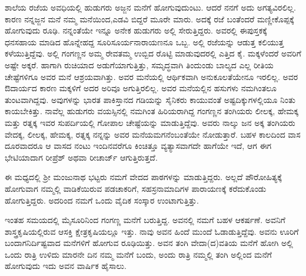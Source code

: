 {ಶಾಲೆಯ ರಜೆಯ ಅವಧಿಯಲ್ಲಿ ಹುಡುಗರು ಅಜ್ಜನ ಮನೆಗೆ ಹೋಗುವುದುಂಟು. ಆದರೆ ನನಗೆ ಅದು ಅಗತ್ಯವಿರಲಿಲ್ಲ. ಕಾರಣ ನನ್ನಜ್ಜನ ಮನೆ ನಮ್ಮ ಮನೆಯಿಂದ,\break ಎಡವಿ ಬಿದ್ದರೆ ಮೂರೇ ಮಾರು. ಅದಕ್ಕೆ ರಜೆ ಬಂತೆಂದರೆ ಮಣ್ಣೀಕೊಪ್ಪಕ್ಕೆ ಹೋಗುವುದು ರೂಢಿ. ನನ್ನಂತೆಯೇ ಇನ್ನೂ ಅನೇಕ ಹುಡುಗರು ಅಲ್ಲಿ ಸೇರುತ್ತಿದ್ದರು. ಅವರಲ್ಲಿ ಈ\break ಪುಸ್ತಕಕ್ಕೆ ಧನಸಹಾಯ ಮಾಡಿದ ಹೊನ್ನೇಹದ್ದ ಸೂರಿ\enginline{-}ಸೂರ್ಯನಾರಾಯಣನೂ ಒಬ್ಬ. ಅಲ್ಲಿ ರಜೆಯನ್ನು ಆಡುತ್ತ ಕಲಿಯುತ್ತ ಕಳೆಯುತ್ತಿದ್ದೆವು. ಅಲ್ಲಿ ಗಂಗಣ್ಣನ ಅಮ್ಮ \enginline{-} \hbox{ರೇವತಮ್ಮ} ಉಬ್ಬಿದ ರೊಟ್ಟಿ ಮಾಡುವುದರಲ್ಲಿ ಎತ್ತಿದ ಕೈ. ಮಕ್ಕಳೆಂದರೆ ಅವರಿಗೆ ಅಷ್ಟೇ ಅಕ್ಕರೆ. ಹಾಗಾಗಿ ರುಚಿಯಾದ ಅಡುಗೆಯಾಗುತ್ತಿತ್ತು, ಸಮೃದ್ಧವಾಗಿ ತಿಂದುಂಡು ಬಾಲ್ಯದ ಎಲ್ಲ ರೀತಿಯ ಚೇಷ್ಟೆಗಳಿಗೂ ಅವರ ಮನೆ ಆಶ್ರಯವಾಗಿತ್ತು. ಅವರ ಮನೆಯಲ್ಲಿ ಆರ್ಥಿಕವಾಗಿ ಅನುಕೂಲತೆಯೇನೂ ಇರಲಿಲ್ಲ. ಅವರ ಔದಾರ್ಯದ ಕಾರಣ ಮಕ್ಕಳಿಗೆ ಅದರ ಅರಿವೂ ಅಗುತ್ತಿರಲಿಲ್ಲ. ಅವರ ಮನೆಯಲ್ಲಿನ ಹಸುಗಳು ನಮಗಿಂತಲೂ ತುಂಟವಾಗಿದ್ದವು. ಅವುಗಳನ್ನು ಭಾರತ ಪಾಕಿಸ್ತಾನದ ಗಡಿಯನ್ನು ಸೈನಿಕರು ಕಾಯುವಂತೆ ಅಷ್ಟದಿಕ್ಕುಗಳಲ್ಲಿಯೂ ನಿಂತು ಕಾಯಬೇಕಿತ್ತು. ನಾವೆಲ್ಲ ಹುಡುಗರು ವಯಸ್ಸಿನಲ್ಲಿ ನಮಗಿಂತ ಹಿರಿಯರಾಗಿದ್ದ ಗಂಗಣ್ಣನ ತಂಗಿಯರು \enginline{-} ಲೀಲಕ್ಕ, ಹೇಮಕ್ಕ ಮತ್ತು ರತ್ನಕ್ಕ \enginline{-} ಇವರ ಸುಪರ್ದಿಯಲ್ಲಿ ಗೋಪಾಲ ಚೇಷ್ಟೆಯನ್ನು ಮಾಡುತ್ತಿದ್ದೆವು. ಅವರು ನಾಲ್ಕು ಜನ ಅಕ್ಕ ತಂಗಿಯರು \enginline{-} ವೇದಕ್ಕ, ಲೀಲಕ್ಕ, ಹೇಮಕ್ಕ, ರತ್ನಕ್ಕ ನನ್ನನ್ನು ಅವರ ಮನೆಯ\break ಮಗನೆಂಬಂತೆಯೇ ನೋಡುತ್ತಾರೆ. ಬಹಳ ಕಾಲದಿಂದ ವಾಸ ದೂರವಾದರೂ ಆ ವಾಸದ ನಂಟು ಇಂದಿನವರೆಗೂ ಕಿಂಚಿತ್ತೂ ವ್ಯತ್ಯಾಸವಾಗದೇ ಹಾಗೆಯೇ ಇದೆ, ಆಗ ಈಗ ಭೇಟಿಯಾದಾಗ ರೀಪ್ರೆಶ್ ಅಥವಾ ರೀಚಾರ್ಜ್ ಆಗುತ್ತಿರುತ್ತದೆ. 

ಈ ಮಧ್ಯದಲ್ಲಿ ಶ್ರೀ ಮಂಜುನಾಥ ಭಟ್ಟರು ನಮಗೆ ವೇದದ ಪಾಠಗಳನ್ನು ಮಾಡುತ್ತಿದ್ದರು. ಅಲ್ಲದೆ ಪೌರೋಹಿತ್ಯಕ್ಕೆ ಹೋಗುವಾಗ ನಮ್ಮಲ್ಲಿ ವಾಡಿಕೆಯಿರುವ ಪಡ\-ಚಾಕರಿಗೆ,  ಸಹಸ್ರನಾಮಾದಿಗಳ ಪಾರಾಯಣಕ್ಕೆ ಕರೆದುಕೊಂಡು ಹೋಗುತ್ತಿದ್ದರು. ಅದರಿಂದ ನಮಗೆ ಒಂದು ವೈದಿಕ ಸಂಸ್ಕಾರ ಉಂಟಾಗುತ್ತಿತ್ತು. 

ಇಂತಹ ಸಮಯದಲ್ಲಿ ಮೈಸೂರಿನಿಂದ ಗಂಗಣ್ಣ ಮನೆಗೆ ಬರುತ್ತಿದ್ದ. ಅವನಲ್ಲಿ ನಮಗೆ ಬಹಳ ಆಕರ್ಷಣೆ. ಅವನಿಗೆ ಶಾಸ್ತ್ರಕೃಷಿಯಲ್ಲಿರುವ ಆಸಕ್ತಿ ಕ್ಷೇತ್ರಕೃಷಿಯಲ್ಲೂ ಇತ್ತು. ನಾವು ಅವನ ಹಿಂದೆ ಮುಂದೆ ಓಡಾಡುತ್ತಿದ್ದೆವು. ಅವನು ಊರಿಗೆ ಬಂದಾಗ\break ನಿರ್ದಿಷ್ಟವಾದ ಮನೆಗಳಿಗೆ ಹೋಗುವ ರೂಢಿಯಿತ್ತು. ಅವನ ತಂಗಿ ವೇದಾ(ದ)ವತಿಯ ಮನೆಗೆ ಹೋಗಿ ಅಲ್ಲಿ ಒಂದು ರಾತ್ರಿ ಉಳಿದು ಮಾರನೇ ದಿನ ನಮ್ಮ ಮನೆಗೆ ಬಂದು, ಅಂದು ರಾತ್ರಿ ನಮ್ಮಲ್ಲಿ ತಂಗಿ ಅಲ್ಲಿಂದ ಮನೆಗೆ ಹೋಗುವುದು \enginline{-} ಇದು ಅವನ ವಾರ್ಷಿಕ ಹೈಸಾಲು.

}
